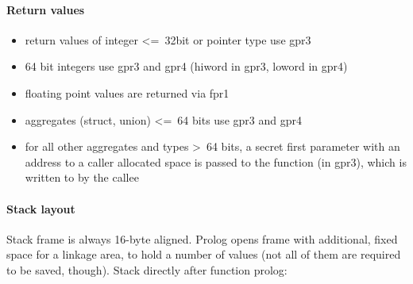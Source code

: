 \paragraph{Return values}

\begin{itemize}
\item return values of integer \textless=\ 32bit or pointer type use gpr3
\item 64 bit integers use gpr3 and gpr4 (hiword in gpr3, loword in gpr4)
\item floating point values are returned via fpr1
\item aggregates (struct, union) \textless=\ 64 bits use gpr3 and gpr4
\item for all other aggregates and types \textgreater\ 64 bits, a secret first parameter with an address to a caller allocated space is passed to the function (in gpr3), which is written to by the callee
\end{itemize}


\paragraph{Stack layout}

Stack frame is always 16-byte aligned. Prolog opens frame with additional, fixed space for a linkage area, to hold a number of values (not all of them are required to be saved, though). Stack directly after function prolog:\\

